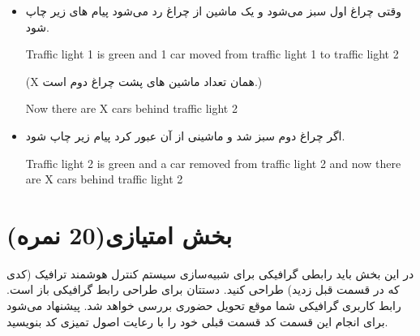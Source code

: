 \documentclass[]{article}
\begin{document}
\begin{itemize}
\item
وقتی چراغ اول سبز می‌شود و یک ماشین از چراغ رد می‌شود پیام های زیر چاپ شود.
\begin{tcolorbox}[boxrule=0pt]
	\begin{latin}
		\large{
			Traffic light 1 is green and 1 car moved from traffic light 1 to 
			traffic light 2
		}
	\end{latin}
\end{tcolorbox}
(X همان تعداد ماشین های پشت چراغ دوم است.)
\begin{tcolorbox}[boxrule=0pt]
	\begin{latin}
		\large{
			Now there are X cars behind traffic light 2
		}
	\end{latin}
\end{tcolorbox}

\item
اگر چراغ دوم سبز شد و ماشینی از آن عبور کرد پیام زیر چاپ شود.
\begin{tcolorbox}[boxrule=0pt]
	\begin{latin}
		\large{
			Traffic light 2 is green and a car removed from traffic light 2 and 
			now there are X cars behind traffic light 2
		}
	\end{latin}
\end{tcolorbox}
\end{itemize}

\newpage

\section{بخش امتیازی(20 نمره)}
در این بخش باید رابطی گرافیکی برای شبیه‌سازی سیستم کنترل هوشمند ترافیک (کدی 
که در قسمت قبل زدید) طراحی کنید. دستتان برای طراحی رابط گرافیکی باز است. 
رابط کاربری گرافیکی شما موقع تحویل حضوری بررسی خواهد شد. پیشنهاد می‌شود برای 
انجام این قسمت کد قسمت قبلی خود را با رعایت اصول تمیزی کد بنویسید. 
\end{document}
